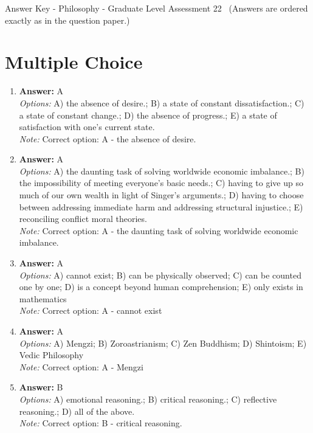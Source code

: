 \documentclass[12pt]{article}
\begin{document}
\begin{center}
Answer Key - Philosophy - Graduate Level Assessment 22 \
\small (Answers are ordered exactly as in the question paper.)
\end{center}

\section*{Multiple Choice}
\begin{enumerate}[label=\arabic*.]
\item \textbf{Answer:} A
\\ \textit{Options:} A) the absence of desire.; B) a state of constant dissatisfaction.; C) a state of constant change.; D) the absence of progress.; E) a state of satisfaction with one's current state.
\\ \textit{Note:} Correct option: A - the absence of desire.
\item \textbf{Answer:} A
\\ \textit{Options:} A) the daunting task of solving worldwide economic imbalance.; B) the impossibility of meeting everyone's basic needs.; C) having to give up so much of our own wealth in light of Singer's arguments.; D) having to choose between addressing immediate harm and addressing structural injustice.; E) reconciling conflict moral theories.
\\ \textit{Note:} Correct option: A - the daunting task of solving worldwide economic imbalance.
\item \textbf{Answer:} A
\\ \textit{Options:} A) cannot exist; B) can be physically observed; C) can be counted one by one; D) is a concept beyond human comprehension; E) only exists in mathematics
\\ \textit{Note:} Correct option: A - cannot exist
\item \textbf{Answer:} A
\\ \textit{Options:} A) Mengzi; B) Zoroastrianism; C) Zen Buddhism; D) Shintoism; E) Vedic Philosophy
\\ \textit{Note:} Correct option: A - Mengzi
\item \textbf{Answer:} B
\\ \textit{Options:} A) emotional reasoning.; B) critical reasoning.; C) reflective reasoning.; D) all of the above.
\\ \textit{Note:} Correct option: B - critical reasoning.
\end{enumerate}
\end{document}
